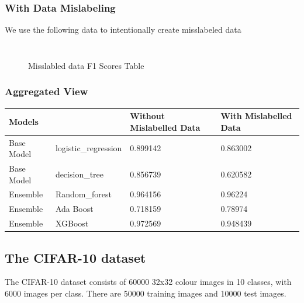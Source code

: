 \documentclass{article}
\begin{document}
\subsubsection{With Data Mislabeling}

We use the following data to intentionally create misslabeled data

\inputminted[frame=single,framesep=10pt,fontsize=\footnotesize]{python}{minst/do_miss_label.py}


\inputminted[firstline=93,lastline=142,frame=single,framesep=10pt,fontsize=\footnotesize]{python}{minst/main.py}


\begin{figure}[H]
    \centering
    
    \caption{Misslabled data F1 Scores Table}
\end{figure}

\subsubsection{Aggregated View}


\begin{table}[H]
    \begin{tabular}{|l|l|l|l|}
    \hline
    \multicolumn{2}{|l|}{Models}      & Without Mislabelled Data & With Mislabelled Data \\ \hline
    Base Model & logistic\_regression & 0.899142                 & 0.863002              \\ \hline
    Base Model & decision\_tree       & 0.856739                 & 0.620582              \\ \hline
    Ensemble   & Random\_forest       & 0.964156                 & 0.96224               \\ \hline
    Ensemble   & Ada Boost            & 0.718159                 & 0.78974               \\ \hline
    Ensemble   & XGBoost              & 0.972569                 & 0.948439              \\ \hline
    \end{tabular}
\end{table}

\subsection{The CIFAR-10 dataset}
The CIFAR-10 dataset consists of 60000 32x32 colour images in 10 classes, with 6000 images per class. There are 50000 training images and 10000 test images.
\end{document}
